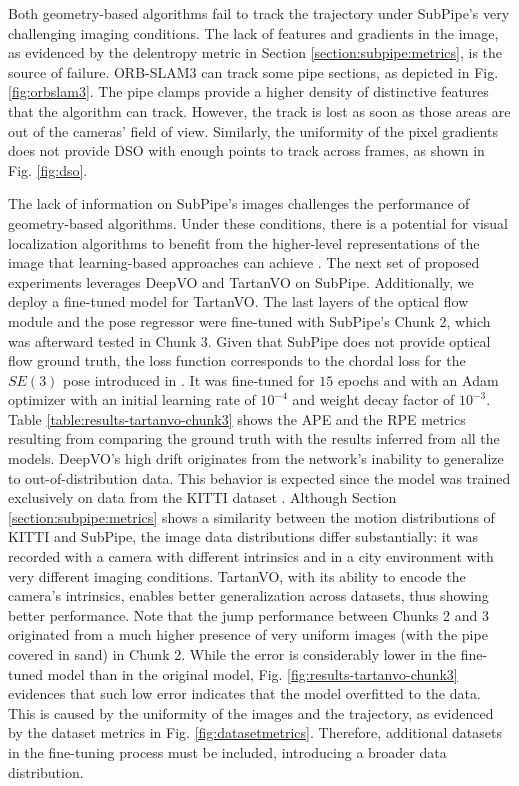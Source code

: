 Both geometry-based algorithms fail to track the trajectory under SubPipe's very challenging imaging conditions. The lack of features and gradients in the image, as evidenced by the delentropy metric in Section \ref{section:subpipe:metrics}, is the source of failure. ORB-SLAM3 can track some pipe sections, as depicted in Fig. \ref{fig:orbslam3}. The pipe clamps provide a higher density of distinctive features that the algorithm can track. However, the track is lost as soon as those areas are out of the cameras' field of view. Similarly, the uniformity of the pixel gradients does not provide DSO with enough points to track across frames, as shown in Fig. \ref{fig:dso}.

The lack of information on SubPipe's images challenges the performance of geometry-based algorithms. Under these conditions, there is a potential for visual localization algorithms to benefit from the higher-level representations of the image that learning-based approaches can achieve \cite{olaya_survey}. 
The next set of proposed experiments leverages DeepVO and TartanVO on SubPipe. Additionally, we deploy a fine-tuned model for TartanVO.
The last layers of the optical flow module and the pose regressor were fine-tuned with SubPipe's Chunk 2, which was afterward tested in Chunk 3. Given that SubPipe does not provide optical flow ground truth, the loss function corresponds to the chordal loss for the $SE(3)$ pose introduced in \cite{dl:vo:isr}. It was fine-tuned for $15$ epochs and with an Adam optimizer with an initial learning rate of $10^{-4}$ and weight decay factor of $10^{-3}$.
Table \ref{table:results-tartanvo-chunk3} shows the \ac{APE} and the \ac{RPE} \cite{sturm2012tumrgbd} metrics resulting from comparing the ground truth with the results inferred from all the models. 
DeepVO's high drift originates from the network's inability to generalize to out-of-distribution data. This behavior is expected since the model was trained exclusively on data from the KITTI dataset \cite{dataset:kitti}. Although Section \ref{section:subpipe:metrics} shows a similarity between the motion distributions of KITTI and SubPipe, the image data distributions differ substantially: it was recorded with a camera with different intrinsics and in a city environment with very different imaging conditions.
TartanVO, with its ability to encode the camera's intrinsics, enables better generalization across datasets, thus showing better performance. Note that the jump performance between Chunks 2 and 3 originated from a much higher presence of very uniform images (with the pipe covered in sand) in Chunk 2.
While the error is considerably lower in the fine-tuned model than in the original model, Fig. \ref{fig:results-tartanvo-chunk3} evidences that such low error indicates that the model overfitted to the data. This is caused by the uniformity of the images and the trajectory, as evidenced by the dataset metrics in Fig. \ref{fig:datasetmetrics}. Therefore, additional datasets in the fine-tuning process must be included, introducing a broader data distribution.

